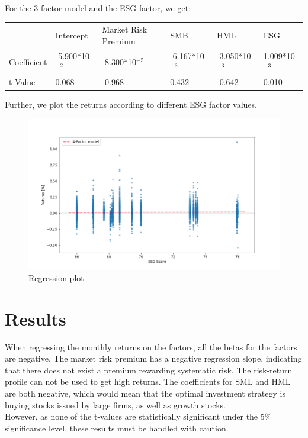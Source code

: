\documentclass[12pt, a4paper]{article}%
\begin{document}
For the 3-factor model and the ESG factor, we get: \\
\begin{table}[]
    \begin{tabular}{llllll}
                & Intercept                       & Market Risk Premium             & SMB                             & HML                             & ESG                            \\
    Coefficient & -5.900*10$^{-2}$ & -8.300*10$^{-5}$ & -6.167*10$^{-3}$ & -3.050*10$^{-3}$ & 1.009*10$^{-3}$ \\
    t-Value     & 0.068                           & -0.968                          & 0.432                           & -0.642                          & 0.010                         
    \end{tabular}
    \end{table}


Further, we plot the returns according to different ESG factor values.\\ %

\begin{figure}
    \centering
    \includegraphics[width=\textwidth]{../figures/regression.png}
    \caption{Regression plot}
    \label{fig:regression}
  \end{figure}

\section{Results} 
When regressing the monthly returns on the \textcite{FamaFrench1992} factors, all the betas for the factors are negative. The market risk premium has a negative regression slope, indicating that there does not exist a premium rewarding systematic risk. The risk-return profile can not be used to get high returns.
The coefficients for SML and HML are both negative, which would mean that the optimal investment strategy is buying stocks issued by large firms, as well as growth stocks.\\
However, as none of the t-values are statistically significant under the 5\% significance level, these results must be handled with caution.\\
\end{document}
